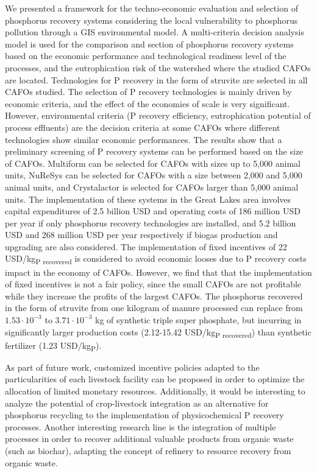 \documentclass[authoryear]{elsarticle}
\begin{document}
We presented a framework for the techno-economic evaluation and selection of phosphorus recovery systems
considering the local vulnerability to phosphorus pollution through a GIS environmental model. A multi-criteria decision analysis model is used for the comparison and section of phosphorus recovery systems based on the economic performance and technological readiness level of the processes, and the eutrophication risk of the watershed where the studied CAFOs are located. Technologies for P recovery in the form of struvite are selected in all CAFOs studied. The selection of P recovery technologies is mainly driven by economic criteria, and the effect of the economies of scale is very significant. However, environmental criteria (P recovery efficiency, eutrophication potential of process effluents) are the decision criteria at some CAFOs where different technologies show similar economic performances. The results show that a preliminary screening of P recovery systems can be performed based on the size of CAFOs. Multiform can be selected for CAFOs with sizes up to 5,000 animal units,
NuReSys can be selected for CAFOs with a size between 2,000 and 5,000 animal units, and Crystalactor is selected for CAFOs larger than 5,000 animal units. The implementation of these systems in the Great Lakes area involves capital expenditures of 2.5 billion USD and operating costs of 186 million USD per year if only phosphorus recovery technologies are installed, and 5.2 billion USD and 268 million USD per year respectively if biogas production and upgrading are also considered. The implementation of fixed incentives of 22 USD/kg\textsubscript{P recovered} is considered to avoid economic looses due to P recovery costs impact in the economy of CAFOs. However, we find that that the implementation of
fixed incentives is not a fair policy, since the small CAFOs are not profitable while they increase the
profits of the largest CAFOs. The phosphorus recovered in the form of struvite from one kilogram of manure processed can replace from $1.53\cdot 10^{-3}$ to $3.71\cdot 10^{-3}$ kg of synthetic triple super phosphate, but incurring in significantly larger production costs (2.12-15.42 USD/kg\textsubscript{P recovered}) than synthetic fertilizer (1.23  USD/kg\textsubscript{P}). 

As part of future work, customized incentive policies adapted to the particularities of each livestock facility can be proposed in order to optimize the allocation of limited monetary resources. Additionally, it would be interesting to analyze the potential of crop-livestock integration as an alternative for phosphorus recycling to the implementation of physicochemical P recovery processes. Another interesting research line is the integration of multiple processes in order to recover additional valuable products from organic waste (such as biochar), adapting the concept of refinery to resource recovery from organic waste.
\end{document}
